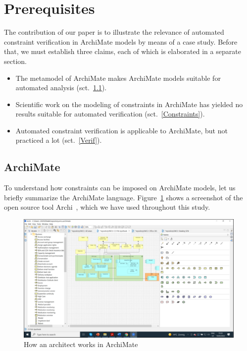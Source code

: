 \documentclass[sn-vancouver]{sn-jnl}%
\theoremstyle{thmstyleone}%
\theoremstyle{thmstyletwo}%
\theoremstyle{thmstylethree}%
\begin{document}
\section{Prerequisites}\label{Prerequisites}
The contribution of our paper is to illustrate the relevance of automated constraint verification in ArchiMate models by means of a case study.
Before that, we must establish three claims, each of which is elaborated in a separate section.
\begin{itemize}
   \item The metamodel of ArchiMate makes ArchiMate models suitable for automated analysis (sct.~\ref{ArchiMate}).
   \item Scientific work on the modeling of constraints in ArchiMate has yielded no results suitable for automated verification (sct.~\ref{Constraints}).
   \item Automated constraint verification is applicable to ArchiMate, but not practiced a lot (sct.~\ref{Verif}).
\end{itemize}

\subsection{ArchiMate}\label{ArchiMate}
To understand how constraints can be imposed on ArchiMate models,
let us briefly summarize the ArchiMate language.
Figure~\ref{how} shows a screenshot of the open source tool Archi~\cite{beauvoir2018archi}, which we have used throughout this study.

\begin{figure}[hbtp]
 \centering
\includegraphics[clip=true, scale=0.5]{HowArchitectWorks}
\caption{How an architect works in ArchiMate}
\label{how}   %
\end{figure}
\end{document}
